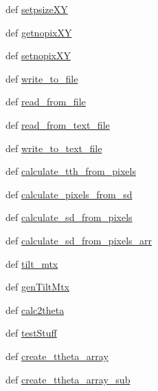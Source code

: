 \begin{DoxyCompactItemize}
\item 
def \hyperlink{classmy_detector_1_1my_detector_a9018d849252b07724e9046a615c27e0b}{setpsize\-X\-Y}
\item 
def \hyperlink{classmy_detector_1_1my_detector_a8f5b1f53fa3905551d797312390be7e9}{getnopix\-X\-Y}
\item 
def \hyperlink{classmy_detector_1_1my_detector_a17e10421e1beb0ace96f0e0075d923d8}{setnopix\-X\-Y}
\item 
def \hyperlink{classmy_detector_1_1my_detector_a47f4a741e9c43ea2ca937b38d26d85bd}{write\-\_\-to\-\_\-file}
\item 
def \hyperlink{classmy_detector_1_1my_detector_a28805fea27eebf5e4b50defd31842d9b}{read\-\_\-from\-\_\-file}
\item 
def \hyperlink{classmy_detector_1_1my_detector_a22f02df85f7dd4f30ab64d7e0b204b6a}{read\-\_\-from\-\_\-text\-\_\-file}
\item 
def \hyperlink{classmy_detector_1_1my_detector_a07bb062a70ceaec37614c8877e6ae659}{write\-\_\-to\-\_\-text\-\_\-file}
\item 
def \hyperlink{classmy_detector_1_1my_detector_a2f7eb213400bfad0ffd110b060ce2469}{calculate\-\_\-tth\-\_\-from\-\_\-pixels}
\item 
def \hyperlink{classmy_detector_1_1my_detector_ad897737f4883453052f916edaee91ac0}{calculate\-\_\-pixels\-\_\-from\-\_\-sd}
\item 
def \hyperlink{classmy_detector_1_1my_detector_a8e63ddf3ddf9aa2972ee936c27788915}{calculate\-\_\-sd\-\_\-from\-\_\-pixels}
\item 
def \hyperlink{classmy_detector_1_1my_detector_abd5c5ca2d3f99a6759a1a9b670ef6b2e}{calculate\-\_\-sd\-\_\-from\-\_\-pixels\-\_\-arr}
\item 
def \hyperlink{classmy_detector_1_1my_detector_a1b53a39b4e53442c2a7f7fb9ee77e156}{tilt\-\_\-mtx}
\item 
def \hyperlink{classmy_detector_1_1my_detector_a91ee215369c918ef83d0c8598daeab46}{gen\-Tilt\-Mtx}
\item 
def \hyperlink{classmy_detector_1_1my_detector_a089663282c90924b0fc4e2f53bb96aa2}{calc2theta}
\item 
def \hyperlink{classmy_detector_1_1my_detector_a10dd4f576fd9e8cd3cbfb45625a74113}{test\-Stuff}
\item 
def \hyperlink{classmy_detector_1_1my_detector_a16783ce90d948c85c5cf0a2930c60a4f}{create\-\_\-ttheta\-\_\-array}
\item 
def \hyperlink{classmy_detector_1_1my_detector_a9558eaedd3456b1705b8962d861f7b1c}{create\-\_\-ttheta\-\_\-array\-\_\-sub}

\end{DoxyCompactItemize}

